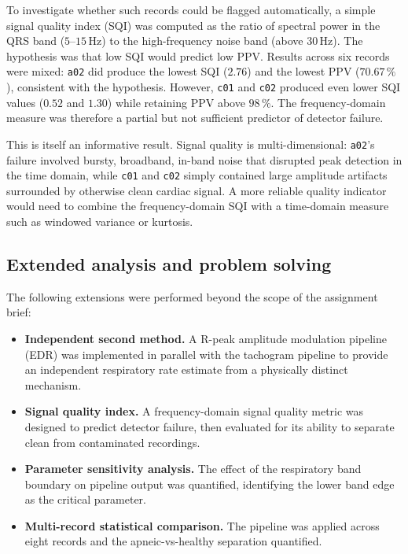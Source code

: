 \documentclass[11pt,a4paper]{article}
\begin{document}
To investigate whether such records could be flagged automatically, a simple signal quality index (SQI) was computed as the ratio of spectral power in the QRS band ($5$--$15$\,Hz) to the high-frequency noise band (above $30$\,Hz). The hypothesis was that low SQI would predict low PPV. Results across six records were mixed: \texttt{a02} did produce the lowest SQI ($2.76$) and the lowest PPV ($70.67\,\%$), consistent with the hypothesis. However, \texttt{c01} and \texttt{c02} produced even lower SQI values ($0.52$ and $1.30$) while retaining PPV above $98\,\%$. The frequency-domain measure was therefore a partial but not sufficient predictor of detector failure.

This is itself an informative result. Signal quality is multi-dimensional: \texttt{a02}'s failure involved bursty, broadband, in-band noise that disrupted peak detection in the time domain, while \texttt{c01} and \texttt{c02} simply contained large amplitude artifacts surrounded by otherwise clean cardiac signal. A more reliable quality indicator would need to combine the frequency-domain SQI with a time-domain measure such as windowed variance or kurtosis.

\subsection{Extended analysis and problem solving}
The following extensions were performed beyond the scope of the assignment brief:
\begin{itemize}
    \item \textbf{Independent second method.} A R-peak amplitude modulation pipeline (EDR) was implemented in parallel with the tachogram pipeline to provide an independent respiratory rate estimate from a physically distinct mechanism.
    \item \textbf{Signal quality index.} A frequency-domain signal quality metric was designed to predict detector failure, then evaluated for its ability to separate clean from contaminated recordings.
    \item \textbf{Parameter sensitivity analysis.} The effect of the respiratory band boundary on pipeline output was quantified, identifying the lower band edge as the critical parameter.
    \item \textbf{Multi-record statistical comparison.} The pipeline was applied across eight records and the apneic-vs-healthy separation quantified.
\end{itemize}
\end{document}
